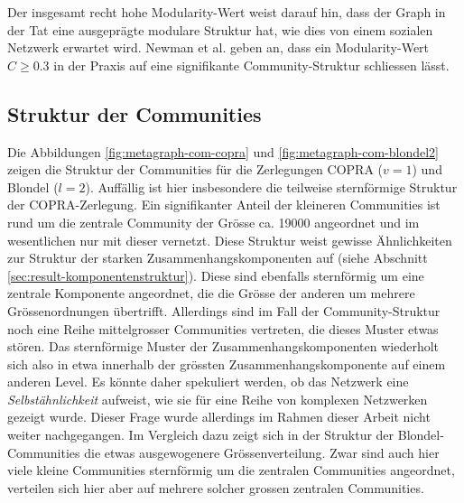 Der insgesamt recht hohe Modularity-Wert weist darauf hin, dass der
Graph in der Tat eine ausgepr\"agte modulare Struktur hat, wie dies
von einem sozialen Netzwerk erwartet wird. Newman et al. geben an,
dass ein Modularity-Wert $C \ge 0.3$ in der Praxis auf eine
signifikante Community-Struktur schliessen l\"asst\cite{Clauset2004}.

\subsection{Struktur der Communities}
\label{sec:strukt-der-comm}

Die Abbildungen \ref{fig:metagraph-com-copra} und
\ref{fig:metagraph-com-blondel2} zeigen die Struktur der Communities
f\"ur die Zerlegungen COPRA ($v=1$) und Blondel ($l=2$). Auff\"allig
ist hier insbesondere die teilweise sternf\"ormige Struktur der
COPRA-Zerlegung. Ein signifikanter Anteil der kleineren Communities
ist rund um die zentrale Community der Gr\"osse ca. 19000 angeordnet
und im wesentlichen nur mit dieser vernetzt. Diese Struktur weist
gewisse \"Ahnlichkeiten zur Struktur der starken
Zusammenhangskomponenten auf (siehe Abschnitt
\ref{sec:result-komponentenstruktur}). Diese sind ebenfalls
sternf\"ormig um eine zentrale Komponente angeordnet, die die Gr\"osse
der anderen um mehrere Gr\"ossenordnungen \"ubertrifft. Allerdings
sind im Fall der Community-Struktur noch eine Reihe mittelgrosser
Communities vertreten, die dieses Muster etwas st\"oren. Das
sternf\"ormige Muster der Zusammenhangskomponenten wiederholt sich
also in etwa innerhalb der gr\"ossten Zusammenhangskomponente auf
einem anderen Level. Es k\"onnte daher spekuliert werden, ob das
Netzwerk eine \emph{Selbst\"ahnlichkeit} aufweist, wie sie f\"ur eine
Reihe von komplexen Netzwerken gezeigt wurde\cite{Song2005}. Dieser
Frage wurde allerdings im Rahmen dieser Arbeit nicht weiter
nachgegangen. Im Vergleich dazu zeigt sich in der Struktur der
Blondel-Communities die etwas ausgewogenere Gr\"ossenverteilung. Zwar
sind auch hier viele kleine Communities sternf\"ormig um die zentralen
Communities angeordnet, verteilen sich hier aber auf mehrere solcher
grossen zentralen Communities.

